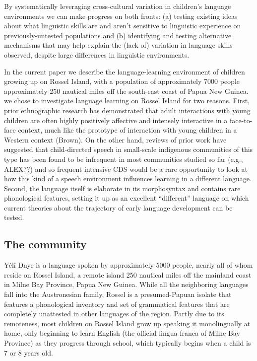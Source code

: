 \documentclass[floatsintext,man]{apa6}
\theoremstyle{definition}
\theoremstyle{definition}
\theoremstyle{definition}
\theoremstyle{remark}
\begin{document}
By systematically leveraging cross-cultural variation in children's
language environments we can make progress on both fronts: (a) testing
existing ideas about what linguistic skills are and aren't sensitive to
linguistic experience on previously-untested populations and (b)
identifying and testing alternative mechanisms that may help explain the
(lack of) variation in language skills observed, despite large
differences in linguistic environments.

In the current paper we describe the language-learning environment of
children growing up on Rossel Island, with a population of approximately
7000 people approximately 250 nautical miles off the south-east coast of
Papua New Guinea. we chose to investigate language learning on Rossel
Island for two reasons. First, prior ethnographic research has
demonstrated that adult interactions with young children are often
highly positively affective and intensely interactive in a face-to-face
context, much like the prototype of interaction with young children in a
Western context (Brown). On the other hand, reviews of prior work have
suggested that child-directed speech in small-scale indigenous
communities of this type has been found to be infrequent in most
communities studied so far (e.g., ALEX??) and so frequent intensive CDS
would be a rare opportunity to look at how this kind of a speech
environment influences learning in a different language. Second, the
language itself is elaborate in its morphosyntax and contains rare
phonological features, setting it up as an excellent \enquote{different}
language on which current theories about the trajectory of early
language development can be tested.

\subsection{The community}\label{the-community}

Yélî Dnye is a language spoken by approximately 5000 people, nearly all
of whom reside on Rossel Island, a remote island 250 nautical miles off
the mainland coast in Milne Bay Province, Papua New Guinea. While all
the neighboring languages fall into the Austronesian family, Rossel is a
presumed-Papuan isolate that features a phonological inventory and set
of grammatical features that are completely unattested in other
languages of the region. Partly due to its remoteness, most children on
Rossel Island grow up speaking it monolingually at home, only beginning
to learn English (the official lingua franca of Milne Bay Province) as
they progress through school, which typically begins when a child is 7
or 8 years old.
\end{document}
